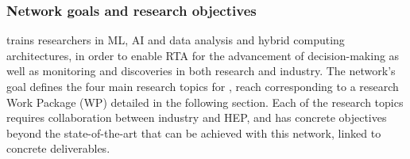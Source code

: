 
\subsubsection{Network goals and research objectives}

\acronym trains researchers in ML, AI and data analysis and hybrid computing architectures, in order to enable RTA for the advancement of decision-making as well as monitoring and discoveries in both research and industry. 
The network's goal defines the four main research topics for \acronym, reach corresponding to a research Work Package (WP) detailed in the following section.
Each of the research topics requires collaboration between industry and HEP, and has concrete objectives beyond the state-of-the-art that can be achieved with this network, linked to concrete deliverables. 

